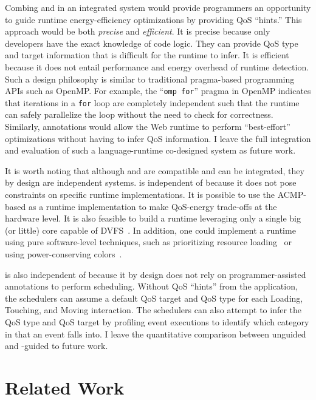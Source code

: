 Combing \greenweb and \webrt in an integrated system would provide programmers an opportunity to guide runtime energy-efficiency optimizations by providing QoS ``hints.'' This approach would be both \textit{precise} and \textit{efficient}. It is precise because only developers have the exact knowledge of code logic. They can provide QoS type and target information that is difficult for the runtime to infer. It is efficient because it does not entail performance and energy overhead of runtime detection. Such a design philosophy is similar to traditional pragma-based programming APIs such as OpenMP. For example, the ``\texttt{omp for}'' pragma in OpenMP indicates that iterations in a \texttt{for} loop are completely independent such that the runtime can safely parallelize the loop without the need to check for correctness. Similarly, \greenweb annotations would allow the Web runtime to perform ``best-effort'' optimizations without having to infer QoS information. I leave the full integration and evaluation of such a language-runtime co-designed system as future work.

It is worth noting that although \greenweb and \webrt are compatible and can be integrated, they by design are independent systems. \greenweb is independent of \webrt because it does not pose constraints on specific runtime implementations. It is possible to use the ACMP-based \webrt as a \greenweb runtime implementation to make QoS-energy trade-offs at the hardware level. It is also feasible to build a runtime leveraging only a single big (or little) core capable of DVFS~\cite{pgdvfs, vsmp}. In addition, one could implement a \greenweb runtime using pure software-level techniques, such as prioritizing resource loading~\cite{klotski} or using power-conserving colors~\cite{chameleon}. 

\webrt is also independent of \greenweb because it by design does not rely on programmer-assisted annotations to perform scheduling. Without QoS ``hints'' from the application, the \webrt schedulers can assume a default QoS target and QoS type for each Loading, Touching, and Moving interaction. The \webrt schedulers can also attempt to infer the QoS type and QoS target by profiling event executions to identify which category in  that an event falls into. I leave the quantitative comparison between unguided and \greenweb-guided \webrt to future work.

\section{Related Work}
\label{sec:lang:related}

